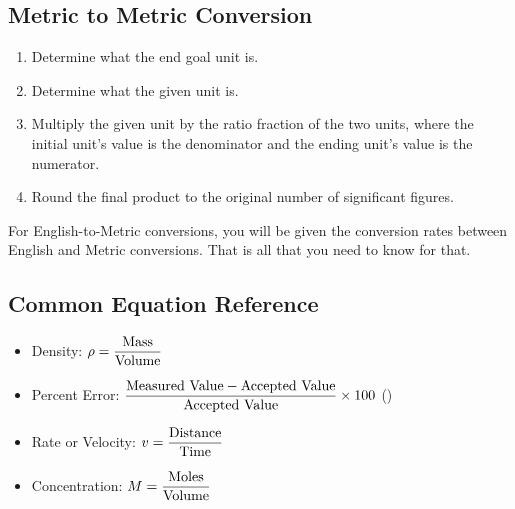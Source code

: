 \noindent
{}

\vspace{2em}

\begin{minipage}{\textwidth}
\subsection{Metric to Metric Conversion}

\begin{enumerate}
	\item Determine what the end goal unit is.
	\item Determine what the given unit is.
	\item Multiply the given unit by the ratio fraction of the two units, where the initial unit's value is the denominator and the ending unit's value is the numerator.
	\item Round the final product to the original number of significant figures. \\
\end{enumerate}
\end{minipage}

\noindent
For English-to-Metric conversions, you will be given the conversion rates between English and Metric conversions. That is all that you need to know for that.

\subsection{Common Equation Reference}
\begin{itemize}
\item Density: $\rho = \displaystyle \frac{\text{Mass}}{\text{Volume}}$
\item Percent Error: $\displaystyle \frac{\text{Measured Value} - \text{Accepted Value}}{\text{Accepted Value}} \times 100$ ()
\item Rate or Velocity: $\displaystyle v = \frac{\text{Distance}}{\text{Time}}$
\item Concentration: $\displaystyle M = \frac{\text{Moles}}{\text{Volume}}$
\end{itemize}

